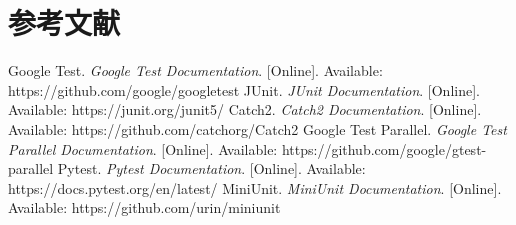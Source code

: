 \documentclass{article}
\begin{document}
\section{参考文献}
\begin{thebibliography}{99}
     Google Test. \textit{Google Test Documentation}. [Online]. Available: https://github.com/google/googletest
     JUnit. \textit{JUnit Documentation}. [Online]. Available: https://junit.org/junit5/
     Catch2. \textit{Catch2 Documentation}. [Online]. Available: https://github.com/catchorg/Catch2
     Google Test Parallel. \textit{Google Test Parallel Documentation}. [Online]. Available: https://github.com/google/gtest-parallel
     Pytest. \textit{Pytest Documentation}. [Online]. Available: https://docs.pytest.org/en/latest/
     MiniUnit. \textit{MiniUnit Documentation}. [Online]. Available: https://github.com/urin/miniunit
\end{thebibliography}
\end{document}
